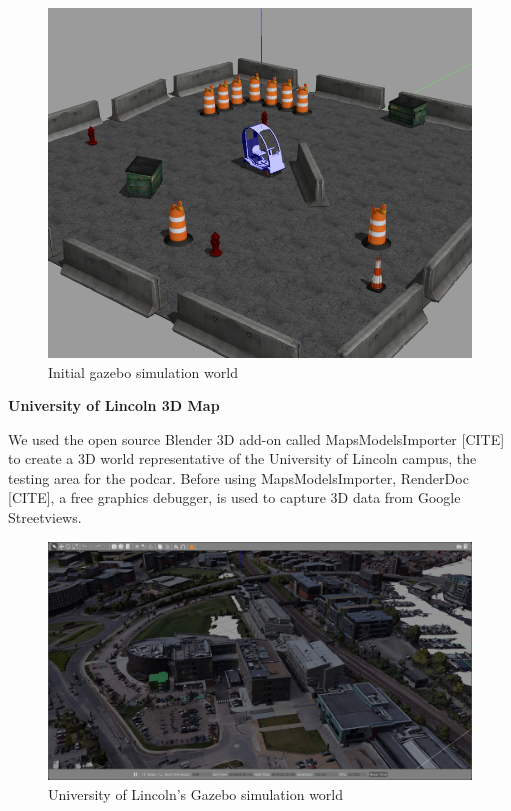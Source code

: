 \documentclass[a4paper]{article}
\begin{document}
\begin{figure}[h]
	\includegraphics[width=\columnwidth]{figs_sim/podcar_loaded_gazebo.png}
	\caption{Initial gazebo simulation world}
	\label{fig:sim_world}
\end{figure}

\textbf{University of Lincoln 3D Map}

We used the open source Blender 3D add-on called MapsModelsImporter [CITE] to create a 3D world representative of the University of Lincoln campus, the testing area for the podcar. Before using MapsModelsImporter, RenderDoc [CITE], a free graphics debugger, is used to capture 3D data from Google Streetviews.  

\begin{figure}[h]
	\includegraphics[width=\textwidth]{figs_sim/INBLincoln_2.png}
	\caption{University of Lincoln's Gazebo simulation world}
	\label{fig:INB_world}
\end{figure}
\end{document}
